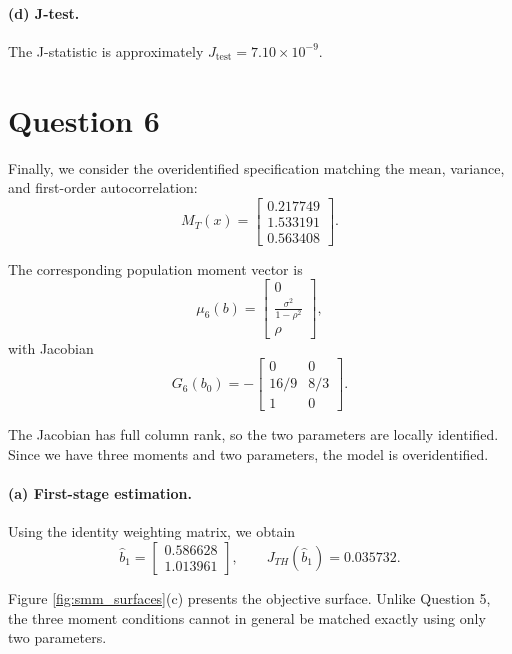\documentclass{article}
\begin{document}
\paragraph{(d) J-test.}

The J-statistic is approximately $J_{\mathrm{test}}=7.10\times10^{-9}$.


\section*{Question 6}

Finally, we consider the overidentified specification matching
the mean, variance, and first-order autocorrelation:
\[
    M_T(x)
    =
    \begin{bmatrix}
        0.217749\\
        1.533191\\
        0.563408
    \end{bmatrix}.
\]

The corresponding population moment vector is
\[
    \mu_6(b)
    =
    \begin{bmatrix}
        0\\[4pt]
        \displaystyle\frac{\sigma^2}{1-\rho^2}\\[6pt]
        \rho
    \end{bmatrix},
\]
with Jacobian
\[
    G_6(b_0)
    =
    -
    \begin{bmatrix}
        0 & 0\\
        16/9 & 8/3\\
        1 & 0
    \end{bmatrix}.
\]

The Jacobian has full column rank, so the two parameters are
locally identified. Since we have three moments and two
parameters, the model is overidentified.

\paragraph{(a) First-stage estimation.}

Using the identity weighting matrix, we obtain
\[
    \widehat b_1
    =
    \begin{bmatrix}
        0.586628\\
        1.013961
    \end{bmatrix},
    \qquad
    J_{TH}(\widehat b_1)=0.035732.
\]

Figure \ref{fig:smm_surfaces}(c) presents the objective surface.
Unlike Question 5, the three moment conditions cannot in
general be matched exactly using only two parameters.
\end{document}
